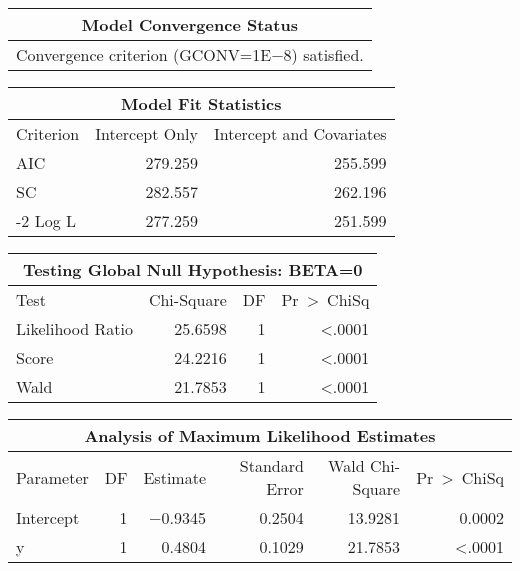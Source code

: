 \documentclass[10pt]{article}
\begin{document}


\begin{longtable}{|c|}\hline
   Model Convergence Status\\\hline
\endhead
   Convergence criterion (GCONV=1E$-$8) satisfied.\\\hline
\end{longtable}



\begin{longtable}{|l|r|r|}\hline
   \multicolumn{3}{|c|}{Model Fit Statistics}\\\hline
   Criterion &    Intercept Only &    Intercept and Covariates\\\hline
\endhead
   AIC &    279.259 &    255.599\\\hline
   SC &    282.557 &    262.196\\\hline
   -2 Log L &    277.259 &    251.599\\\hline
\end{longtable}



\begin{longtable}{|l|r|r|r|}\hline
   \multicolumn{4}{|c|}{Testing Global Null Hypothesis: BETA=0}\\\hline
   Test &    Chi-Square &    DF &    Pr~>~ChiSq\\\hline
\endhead
   Likelihood Ratio &    25.6598 &    1 &    <.0001\\\hline
   Score &    24.2216 &    1 &    <.0001\\\hline
   Wald &    21.7853 &    1 &    <.0001\\\hline
\end{longtable}



\begin{longtable}{|l|r|r|r|r|r|}\hline
   \multicolumn{6}{|c|}{Analysis of Maximum Likelihood Estimates}\\\hline
   Parameter &    DF &    Estimate &    Standard {\newline} Error &    Wald {\newline} Chi-Square &    Pr~>~ChiSq\\\hline
\endhead
   Intercept &    1 &    $-$0.9345 &    0.2504 &    13.9281 &    0.0002\\\hline
   y &    1 &    0.4804 &    0.1029 &    21.7853 &    <.0001\\\hline
\end{longtable}
\end{document}
